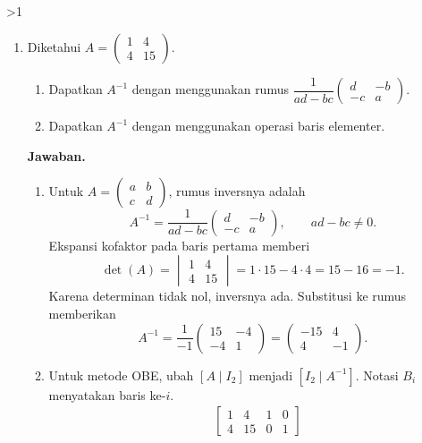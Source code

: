 \documentclass[12pt]{article}
\newcommand{\answername}{Jawaban}
\newenvironment{soaljawab}[1]{%
    \ifnum#1>1\clearpage\fi
    \begin{tcolorbox}[enhanced,breakable,height fill,height fixed for=all,
        sharp corners,colback=white,colframe=black,boxrule=0.4bp,
        boxsep=0pt,left=12bp,right=12bp,top=6bp,bottom=10bp,
        before skip=0pt,after skip=0pt,pad at break=8bp]
    \fontsize{12bp}{14bp}\selectfont
    \setlength{\abovedisplayskip}{8bp}
    \setlength{\belowdisplayskip}{8bp}
    \setlength{\abovedisplayshortskip}{8bp}
    \setlength{\belowdisplayshortskip}{8bp}
    \renewcommand{\arraystretch}{1.15}
    \begin{enumerate}[start=#1,topsep=0pt]
}{%
    \end{enumerate}
    \end{tcolorbox}
}
\newcommand{\jawaban}{\par\medskip\textbf{\answername.}\par\smallskip}
\begin{document}
\begin{soaljawab}{5}
\item Diketahui $A = \begin{pmatrix} 1 & 4 \\ 4 & 15 \end{pmatrix}$.
        \begin{enumerate}
          \item Dapatkan $A^{-1}$ dengan menggunakan rumus $\dfrac{1}{ad-bc} \begin{pmatrix} d & -b \\ -c & a \end{pmatrix}$.
          \item Dapatkan $A^{-1}$ dengan menggunakan operasi baris elementer.
        \end{enumerate}
\jawaban
\begin{enumerate}
\item Untuk $A=\begin{pmatrix}a&b\\c&d\end{pmatrix}$, rumus inversnya adalah
\[
    A^{-1}=\frac1{ad-bc}\begin{pmatrix}d&-b\\-c&a\end{pmatrix},
    \qquad ad-bc\ne0.
\]
Ekspansi kofaktor pada baris pertama memberi
\[
    \det(A)=\begin{vmatrix}
            1 & 4 \\
            4 & 15
        \end{vmatrix}=1\cdot15-4\cdot4=15-16=-1.
\]
Karena determinan tidak nol, inversnya ada. Substitusi ke rumus memberikan
\[
    A^{-1}=\frac1{-1}\begin{pmatrix}
            15 & -4 \\
            -4 & 1
        \end{pmatrix}=\begin{pmatrix}
            -15 & 4 \\
            4 & -1
        \end{pmatrix}.
\]
\item Untuk metode OBE, ubah $[A\mid I_2]$ menjadi $[I_2\mid A^{-1}]$.
Notasi $B_i$ menyatakan baris ke-$i$.
{\setlength{\arraycolsep}{4bp}
\begin{align*}
    & \left[\begin{array}{cc|cc}
            1 & 4 & 1 & 0 \\
            4 & 15 & 0 & 1
        \end{array}\right]

\end{align*}}
\end{enumerate}
\end{soaljawab}
\end{document}
